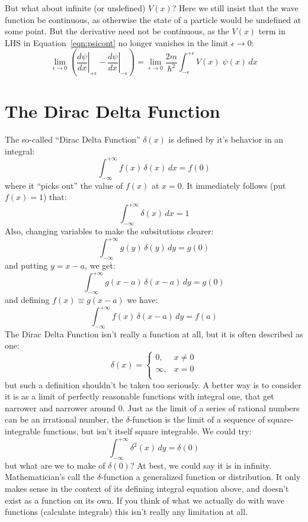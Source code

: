\documentclass[12pt]{book}
\begin{document}
But what about infinite (or undefined) $V(x)$?  Here we still insist that the wave function be continuous, as otherwise the state of a particle would be undefined at some point.  But the derivative need not be continuous, as the $V(x)$ term in LHS in Equation~\ref{eqn:psicont} no longer vanishes in the limit $\epsilon \to 0$:
\begin{equation}
\label{eqn:psidiscont}
\lim_{\epsilon \to 0} \left( \left. \frac{d\psi}{d x} \right\rvert_{+\epsilon} 
- \left. \frac{d\psi}{d x} \right\rvert_{-\epsilon} \right) = 
\lim_{\epsilon \to 0}
\frac{2m}{\hbar^2}\int_{-\epsilon}^{+\epsilon} V(x) \; \psi(x) \, dx
\end{equation}

\section{The Dirac Delta Function}

The so-called ``Dirac Delta Function'' $\delta(x)$ is defined by it's behavior in an integral:
\begin{equation}
\int_{-\infty}^{+\infty} f(x) \, \delta(x) \, dx = f(0) 
\end{equation}
where it ``picks out'' the value of $f(x)$ at $x=0$.  It immediately follows (put $f(x)=1$) that:
\begin{equation}
\int_{-\infty}^{+\infty} \delta(x) \, dx = 1 
\end{equation}
Also, changing variables to make the subsitutions clearer:
$$\int_{-\infty}^{+\infty} g(y) \, \delta(y) \, dy = g(0)$$
and putting $y = x - a$, we get:
$$\int_{-\infty}^{+\infty} g(x-a) \, \delta(x-a) \, dy = g(0)$$
and defining $f(x) \equiv g(x-a)$ we have:
\begin{equation}
\int_{-\infty}^{+\infty} f(x) \, \delta(x-a) \, dy = f(a)
\end{equation}
The Dirac Delta Function isn't really a function at all, but it is often described as one:
$$\delta(x) = \begin{cases}
0, & x \neq 0 \\
\infty, & x=0 \\
\end{cases}
$$
but such a definition shouldn't be taken too seriously.  A better way is to consider it is as a limit of perfectly reasonable functions with integral one, that get narrower and narrower around 0.  Just as the limit of a series of rational numbers can be an irrational number, the $\delta$-function is the limit of a sequence of square-integrable functions, but isn't itself square integrable.  We could try:
\begin{equation*}
\int_{-\infty}^{+\infty} \delta^2(x) \, dy = \delta(0)
\end{equation*}
but what are we to make of $\delta(0)$? At best, we could say it is in infinity.  Mathematician's call the $\delta$-function a generalized function or distribution.  It only makes sense in the context of its defining integral equation above, and doesn't exist as a function on its own.  If you think of what we actually do with wave functions (calculate integrals) this isn't really any limitation at all.
\end{document}
